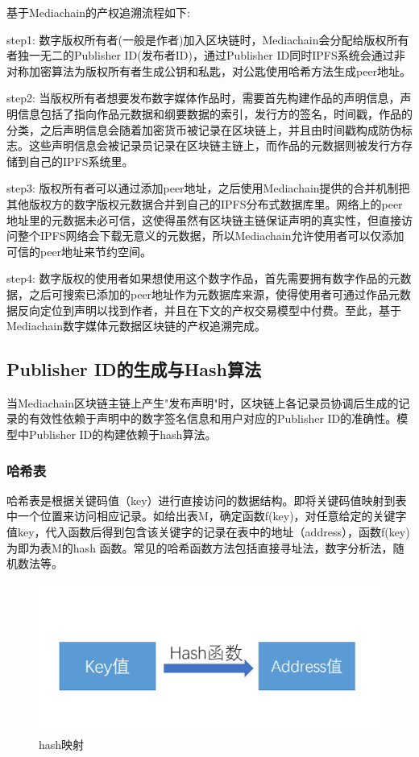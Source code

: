 \documentclass[withoutpreface,bwprint]{cumcmthesis} %
\begin{document}
基于Mediachain的产权追溯流程如下:

step1: 数字版权所有者(一般是作者)加入区块链时，Mediachain会分配给版权所有者独一无二的Publisher ID(发布者ID)，通过Publisher ID同时IPFS系统会通过非对称加密算法为版权所有者生成公钥和私匙，对公匙使用哈希方法生成peer地址。

step2: 当版权所有者想要发布数字媒体作品时，需要首先构建作品的声明信息，声明信息包括了指向作品元数据和纲要数据的索引，发行方的签名，时间戳，作品的分类，之后声明信息会随着加密货币被记录在区块链上，并且由时间戳构成防伪标志。这些声明信息会被记录员记录在区块链主链上，而作品的元数据则被发行方存储到自己的IPFS系统里。

step3: 版权所有者可以通过添加peer地址，之后使用Mediachain提供的合并机制把其他版权方的数字版权元数据合并到自己的IPFS分布式数据库里。网络上的peer地址里的元数据未必可信，这使得虽然有区块链主链保证声明的真实性，但直接访问整个IPFS网络会下载无意义的元数据，所以Mediachain允许使用者可以仅添加可信的peer地址来节约空间。

step4: 数字版权的使用者如果想使用这个数字作品，首先需要拥有数字作品的元数据，之后可搜索已添加的peer地址作为元数据库来源，使得使用者可通过作品元数据反向定位到声明以找到作者，并且在下文的产权交易模型中付费。至此，基于Mediachain数字媒体元数据区块链的产权追溯完成。

\subsection{Publisher ID的生成与Hash算法}
当Mediachain区块链主链上产生"发布声明"时，区块链上各记录员协调后生成的记录的有效性依赖于声明中的数字签名信息和用户对应的Publisher ID的准确性。模型中Publisher ID的构建依赖于hash算法。

\subsubsection{哈希表}

哈希表是根据关键码值（key）进行直接访问的数据结构。即将关键码值映射到表中一个位置来访问相应记录。如给出表M，确定函数f(key)，对任意给定的关键字值key，代入函数后得到包含该关键字的记录在表中的地址（address），函数f(key)为即为表M的hash 函数。常见的哈希函数方法包括直接寻址法，数字分析法，随机数法等。

\begin{figure}[!h]
	\centering
	\includegraphics[width=.6\textwidth]{hash.png}
	\caption{hash映射}
\end{figure}
\end{document}
